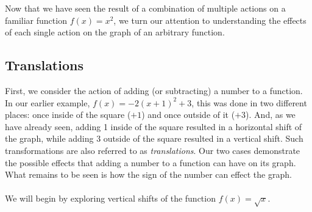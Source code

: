 \documentclass[11pt]{book}
\theoremstyle{definition}  %
\begin{document}
Now that we have seen the result of a combination of multiple actions on a familiar function $f(x)=x^2$, we turn our attention to understanding the effects of each single action on the graph of an arbitrary function.

\newpage

\subsection{Translations}

First, we consider the action of adding (or subtracting) a number to a function.  In our earlier example, $f(x)=-2(x+1)^2+3$, this was done in two different places: once inside of the square ($+1$) and once outside of it ($+3$).  And, as we have already seen, adding 1 inside of the square resulted in a horizontal shift of the graph, while adding 3 outside of the square resulted in a vertical shift.  Such transformations are also referred to as \textit{translations}.  Our two cases demonstrate the possible effects that adding a number to a function can have on its graph.  What remains to be seen is how the sign of the number can effect the graph.\\
~\\
We will begin by exploring vertical shifts of the function $f(x)=\sqrt{x}$.
\end{document}
